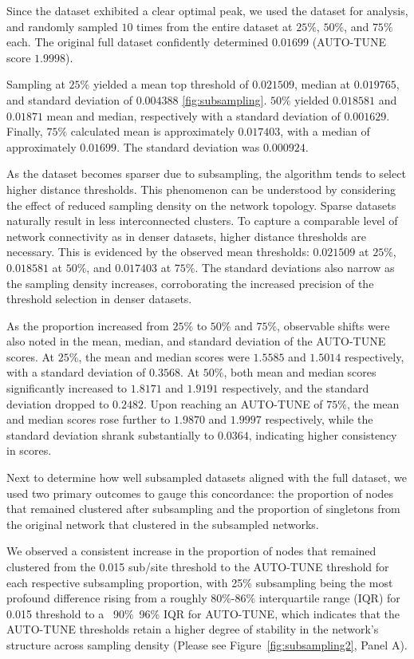 \documentclass[utf8]{FrontiersinHarvard} %
\begin{document}
Since the \citep{rhee_national_2019} dataset exhibited a clear optimal peak, we
used the dataset for analysis, and randomly sampled $10$ times from the entire
dataset at $25\%$, $50\%$, and $75\%$ each. The original full dataset
confidently determined $0.01699$ (AUTO-TUNE score $1.9998$).

Sampling at $25\%$ yielded a mean top threshold of $0.021509$, median at
$0.019765$, and standard deviation of $0.004388$ \ref{fig:subsampling}. $50\%$
yielded $0.018581$ and $0.01871$ mean and median, respectively with a standard
deviation of $0.001629$. Finally, $75\%$ calculated mean is approximately
$0.017403$, with a median of approximately $0.01699$. The standard deviation
was $0.000924$.

As the dataset becomes sparser due to subsampling, the algorithm tends to
select higher distance thresholds. This phenomenon can be understood by
considering the effect of reduced sampling density on the network topology.
Sparse datasets naturally result in less interconnected clusters. To capture a
comparable level of network connectivity as in denser datasets, higher distance
thresholds are necessary. This is evidenced by the observed mean thresholds:
\(0.021509\) at \(25\%\), \(0.018581\) at \(50\%\), and \(0.017403\) at
\(75\%\). The standard deviations also narrow as the sampling density
increases, corroborating the increased precision of the threshold selection in
denser datasets.

As the proportion increased from $25\%$ to $50\%$ and $75\%$, observable shifts
were also noted in the mean, median, and standard deviation of the AUTO-TUNE
scores. At $25\%$, the mean and median scores were $1.5585$ and $1.5014$
respectively, with a standard deviation of $0.3568$. At $50\%$, both mean and
median scores significantly increased to $1.8171$ and $1.9191$ respectively,
and the standard deviation dropped to $0.2482$. Upon reaching an AUTO-TUNE of
$75\%$, the mean and median scores rose further to $1.9870$ and $1.9997$
respectively, while the standard deviation shrank substantially to $0.0364$,
indicating higher consistency in scores.

Next to determine how well subsampled datasets aligned with the full dataset,
we used two primary outcomes to gauge this concordance: the proportion of nodes
that remained clustered after subsampling and the proportion of singletons from
the original network that clustered in the subsampled networks.

We observed a consistent increase in the proportion of nodes that remained
clustered from the 0.015 sub/site threshold to the AUTO-TUNE threshold for each
respective subsampling proportion, with 25\% subsampling being the most
profound difference rising from a roughly 80\%-86\% interquartile range (IQR)
for 0.015 threshold to a ~90\%~96\% IQR for AUTO-TUNE, which indicates that the
AUTO-TUNE thresholds retain a higher degree of stability in the network's
structure across sampling density (Please see Figure~\ref{fig:subsampling2},
Panel A).
\end{document}
